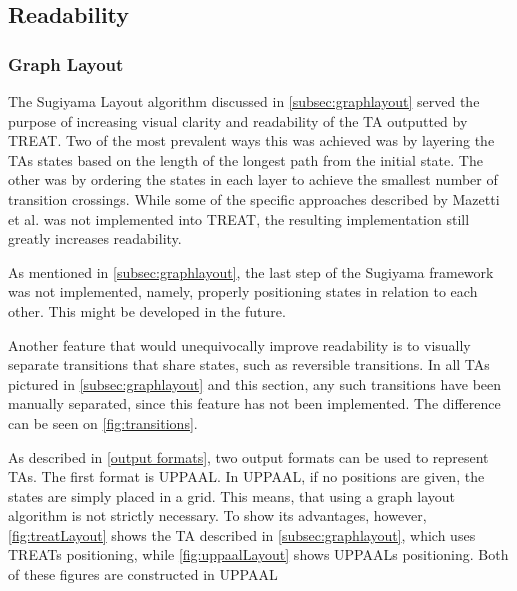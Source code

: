 \subsection{Readability}\label{subsec:readability}

\subsubsection{Graph Layout}
The Sugiyama Layout algorithm discussed in \cref{subsec:graphlayout} served the purpose of increasing visual clarity and readability of the TA outputted by TREAT.
Two of the most prevalent ways this was achieved was by layering the TAs states based on the length of the longest path from the initial state. The other was by ordering the states in each layer to achieve the smallest number of transition crossings.
While some of the specific approaches described by Mazetti et al. \cite{Mazetti2012} was not implemented into TREAT, the resulting implementation still greatly increases readability.

As mentioned in \cref{subsec:graphlayout}, the last step of the Sugiyama framework was not implemented, namely, properly positioning states in relation to each other. This might be developed in the future.

Another feature that would unequivocally improve readability is to visually separate transitions that share states, such as reversible transitions.
In all TAs pictured in \cref{subsec:graphlayout} and this section, any such transitions have been manually separated, since this feature has not been implemented. The difference can be seen on \cref{fig:transitions}.

\begin{center}
    
\end{center}

As described in \cref{output formats}, two output formats can be used to represent TAs.
The first format is UPPAAL. In UPPAAL, if no positions are given, the states are simply placed in a grid. This means, that using a graph layout algorithm is not strictly necessary.
To show its advantages, however, \cref{fig:treatLayout} shows the TA described in \cref{subsec:graphlayout}, which uses TREATs positioning, while \cref{fig:uppaalLayout} shows UPPAALs positioning. Both of these figures are constructed in UPPAAL

